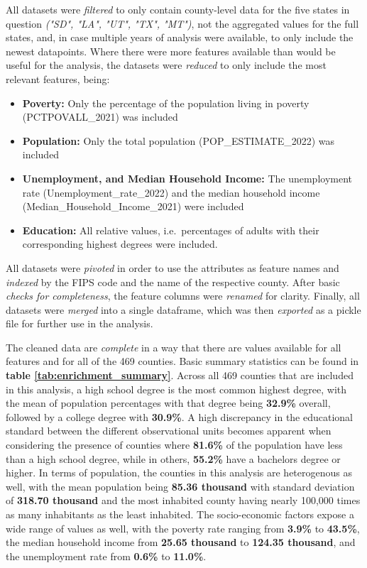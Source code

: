All datasets were \textit{filtered} to only contain county-level data for the five states in question \textit{("SD", "LA", "UT", "TX", "MT")}, not the aggregated values for the full states, and, in case multiple years of analysis were available, to only include the newest datapoints. 
Where there were more features available than would be useful for the analysis, the datasets were \textit{reduced} to only include the most relevant features, being:

\begin{itemize}
    \item \textbf{Poverty:} Only the percentage of the population living in poverty (PCTPOVALL\_2021) was included
    \item \textbf{Population:} Only the total population (POP\_ESTIMATE\_2022) was included
    \item \textbf{Unemployment, and Median Household Income:} The unemployment rate (Unemployment\_rate\_2022) and the median household income (Median\_Household\_Income\_2021) were included
    \item \textbf{Education:} All relative values, i.e.\ percentages of adults with their corresponding highest degrees were included.
\end{itemize}

All datasets were \textit{pivoted} in order to use the attributes as feature names and \textit{indexed} by the FIPS code and the name of the respective county. 
After basic \textit{checks for completeness}, the feature columns were \textit{renamed} for clarity. Finally, all datasets were \textit{merged} into a single dataframe, which was then \textit{exported} as a pickle file for further use in the analysis.

The cleaned data are \textit{complete} in a way that there are values available for all features and for all of the 469 counties. Basic summary statistics can be found in \textbf{table \ref{tab:enrichment_summary}}. 
Across all 469 counties that are included in this analysis, a high school degree is the most common highest degree, with the mean of population percentages with that degree being \textbf{32.9\%} overall, followed by a college degree with \textbf{30.9\%}. 
A high discrepancy in the educational standard between the different observational units becomes apparent when considering the presence of counties where \textbf{81.6\%} of the population have less than a high school degree, while in others, \textbf{55.2\%} have a bachelors degree or higher.
In terms of population, the counties in this analysis are heterogenous as well, with the mean population being \textbf{85.36 thousand} with standard deviation of \textbf{318.70 thousand} and the most inhabited county having nearly 100,000 times as many inhabitants as the least inhabited.
The socio-economic factors expose a wide range of values as well, with the poverty rate ranging from \textbf{3.9\%} to \textbf{43.5\%}, the median household income from \textbf{25.65 thousand} to \textbf{124.35 thousand}, and the unemployment rate from \textbf{0.6\%} to \textbf{11.0\%}.

